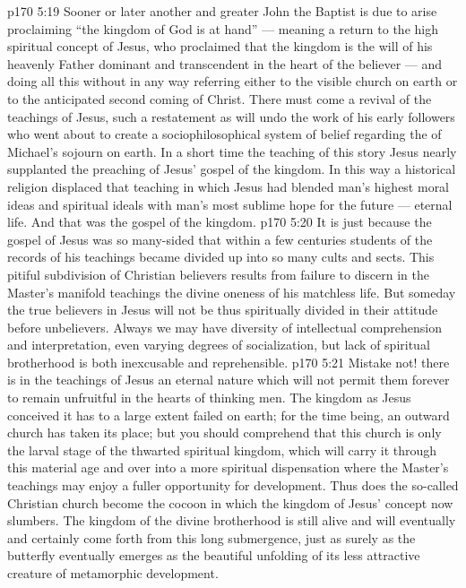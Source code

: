 \vs p170 5:19 Sooner or later another and greater John the Baptist is due to arise proclaiming “the kingdom of God is at hand” --- meaning a return to the high spiritual concept of Jesus, who proclaimed that the kingdom is the will of his heavenly Father dominant and transcendent in the heart of the believer --- and doing all this without in any way referring either to the visible church on earth or to the anticipated second coming of Christ. There must come a revival of the  teachings of Jesus, such a restatement as will undo the work of his early followers who went about to create a sociophilosophical system of belief regarding the  of Michael’s sojourn on earth. In a short time the teaching of this story  Jesus nearly supplanted the preaching of Jesus’ gospel of the kingdom. In this way a historical religion displaced that teaching in which Jesus had blended man’s highest moral ideas and spiritual ideals with man’s most sublime hope for the future --- eternal life. And that was the gospel of the kingdom.
\vs p170 5:20 It is just because the gospel of Jesus was so many\hyp{}sided that within a few centuries students of the records of his teachings became divided up into so many cults and sects. This pitiful subdivision of Christian believers results from failure to discern in the Master’s manifold teachings the divine oneness of his matchless life. But someday the true believers in Jesus will not be thus spiritually divided in their attitude before unbelievers. Always we may have diversity of intellectual comprehension and interpretation, even varying degrees of socialization, but lack of spiritual brotherhood is both inexcusable and reprehensible.
\vs p170 5:21 Mistake not! there is in the teachings of Jesus an eternal nature which will not permit them forever to remain unfruitful in the hearts of thinking men. The kingdom as Jesus conceived it has to a large extent failed on earth; for the time being, an outward church has taken its place; but you should comprehend that this church is only the larval stage of the thwarted spiritual kingdom, which will carry it through this material age and over into a more spiritual dispensation where the Master’s teachings may enjoy a fuller opportunity for development. Thus does the so\hyp{}called Christian church become the cocoon in which the kingdom of Jesus’ concept now slumbers. The kingdom of the divine brotherhood is still alive and will eventually and certainly come forth from this long submergence, just as surely as the butterfly eventually emerges as the beautiful unfolding of its less attractive creature of metamorphic development.
\quizlink

